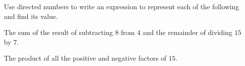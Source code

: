  Use directed numbers to write an expression to represent each of the following and find its value.

\begin{subparts}
  \item The sum of the result of subtracting $8$ from $4$ and the remainder of dividing $15$ by $7$.
  \item The product of all the positive and negative factors of $15$.
\end{subparts}

